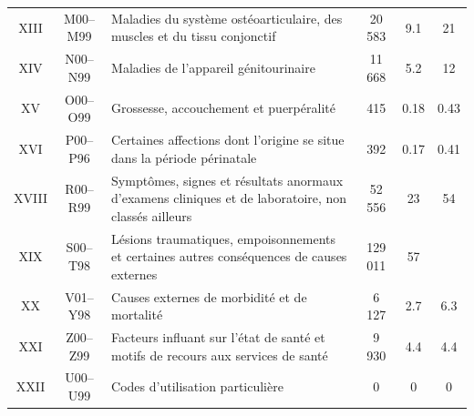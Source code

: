 \documentclass[12pt,english,french,twoside]{book}\usepackage[]{graphicx}\usepackage[]{color}
\begin{document}
\begin{longtable}{|c|c|m{4cm}|c|c|c|}
XIII&M00–M99&Maladies du système ostéoarticulaire, des muscles et du tissu conjonctif&20 583&9.1&21\\

XIV&N00–N99&Maladies de l'appareil génitourinaire&11 668&5.2&12\\

XV&O00–O99&Grossesse, accouchement et puerpéralité&415&0.18&0.43\\

XVI&P00–P96&Certaines affections dont l'origine se situe dans la période périnatale&392&0.17&0.41\\


XVIII&R00–R99&Symptômes, signes et résultats anormaux d'examens cliniques et de laboratoire, non classés ailleurs&52 556&23&54\\

XIX&S00–T98&Lésions traumatiques, empoisonnements et certaines autres conséquences de causes externes&129 011&57& \\

XX&V01–Y98&Causes externes de morbidité et de mortalité& 6 127&2.7&6.3\\

XXI&Z00–Z99&Facteurs influant sur l'état de santé et motifs de recours aux services de santé&9 930&4.4&4.4\\

XXII&U00–U99&Codes d'utilisation particulière & 0&0&0\\

  \hline
\end{longtable}
\end{document}
